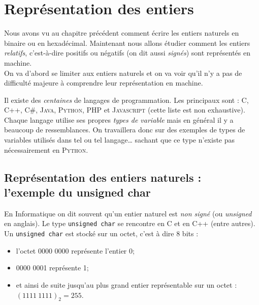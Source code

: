 \chapter{Représentation des entiers}

Nous avons vu au chapitre précédent comment écrire les entiers naturels en binaire ou en hexadécimal. Maintenant nous allons
étudier comment les entiers \textit{relatifs}, c'est-à-dire positifs ou négatifs (on dit aussi \textit{signés}) sont
représentés en machine.\\
On va d'abord se limiter aux entiers naturels et on va voir qu'il n'y a pas de difficulté majeure à comprendre leur représentation en machine.


\begin{remarque}[ importante]
    Il existe des \textit{centaines} de langages de programmation. Les principaux sont : \textsc{C},  \textsc{C++}, \textsc{C\#}, \textsc{Java},
    \textsc{Python}, \textsc{PHP} et \textsc{Javascript} (cette liste est non exhaustive). Chaque langage utilise ses propres \textit{types de variable}
    mais en général il y a beaucoup de ressemblances. On travaillera donc sur des exemples de types de variables utilisés dans tel ou tel langage\ldots
    sachant que ce type n'existe pas nécessairement en \textsc{Python}.
\end{remarque}

\section{Représentation des entiers naturels :\\ l'exemple du unsigned char}

En Informatique on dit souvent qu'un entier naturel est \textit{non signé} (ou \textit{unsigned} en anglais). Le type \texttt{unsigned char} se
rencontre en \textsc{C} et en \textsc{C++} (entre autres).\\

Un \texttt{unsigned char} est stocké sur un octet, c'est à dire 8 bits :
\begin{itemize}
    \item   l'octet 0000 0000 représente l'entier 0;
    \item   0000 0001 représente 1;
    \item   et ainsi de suite jusqu'au plus grand entier représentable sur un octet : $(1111\ 1111)_2=255$.
\end{itemize}

